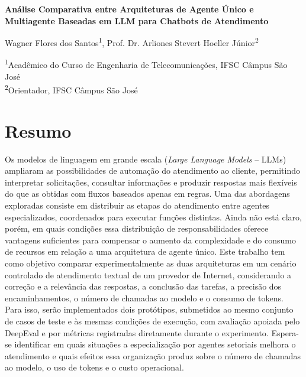 \documentclass[11pt]{ifscarticle}
\begin{document}
\begin{center}
	{\Large \textbf{Análise Comparativa entre Arquiteturas de Agente Único e Multiagente Baseadas em LLM para Chatbots de Atendimento}}\vspace{.3cm}

	Wagner Flores dos Santos\textsuperscript{1}, Prof. Dr. Arliones Stevert Hoeller Júnior\textsuperscript{2} 

	\vspace{.2cm}
	{\small
	\textsuperscript{1}Acadêmico do Curso de Engenharia de Telecomunicações, IFSC Câmpus São José\\
	\textsuperscript{2}Orientador, IFSC Câmpus São José
	}
\end{center}

\vspace{.5cm}

\section*{Resumo}
Os modelos de linguagem em grande escala (\textit{Large Language Models} -- LLMs) ampliaram as possibilidades de automação do atendimento ao cliente, permitindo interpretar solicitações, consultar informações e produzir respostas mais flexíveis do que as obtidas com fluxos baseados apenas em regras. Uma das abordagens exploradas consiste em distribuir as etapas do atendimento entre agentes especializados, coordenados para executar funções distintas. Ainda não está claro, porém, em quais condições essa distribuição de responsabilidades oferece vantagens suficientes para compensar o aumento da complexidade e do consumo de recursos em relação a uma arquitetura de agente único. Este trabalho tem como objetivo comparar experimentalmente as duas arquiteturas em um cenário controlado de atendimento textual de um provedor de Internet, considerando a correção e a relevância das respostas, a conclusão das tarefas, a precisão dos encaminhamentos, o número de chamadas ao modelo e o consumo de tokens. Para isso, serão implementados dois protótipos, submetidos ao mesmo conjunto de casos de teste e às mesmas condições de execução, com avaliação apoiada pelo DeepEval e por métricas registradas diretamente durante o experimento. Espera-se identificar em quais situações a especialização por agentes setoriais melhora o atendimento e quais efeitos essa organização produz sobre o número de chamadas ao modelo, o uso de tokens e o custo operacional.
\end{document}
